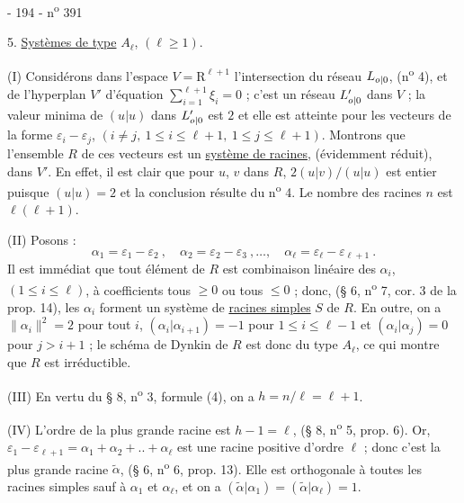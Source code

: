 - 194 - \hfill n\textsuperscript{o} 391

5. \uline{Systèmes de type} $A_\ell$, $(\ell\geq1)$.

(I) Considérons dans l'espace $V=\mathrm R^{\ell+1}$ l'intersection du réseau $L_{\relax{o|0}}$, (n\textsuperscript{o} 4), et de l'hyperplan $V'$ d'équation $\sum_{i=1}^{\ell+1}\xi_i=0$ ; c'est un réseau $L'_{\relax{o|0}}$ dans $V$ ; la valeur minima de $(u|u)$ dans $L'_{\relax{o|0}}$ est $2$ et elle est atteinte pour les vecteurs de la forme $\varepsilon_i-\varepsilon_j$, $(i\neq j,\ 1\leq i\leq\ell+1,\ 1\leq j\leq\ell+1)$. Montrons que l'ensemble $R$ de ces vecteurs est un \uline{système de racines}, (évidemment réduit), dans $V'$. En effet, il est clair que pour $u$, $v$ dans $R$, $2(u|v)/(u|u)$ est entier puisque $(u|u)=2$ et la conclusion résulte du n\textsuperscript{o} 4. Le nombre des racines $n$ est $\ell(\ell+1)$.

(II) Posons :
\[
\alpha_1=\varepsilon_1-\varepsilon_2\ ,\quad
\alpha_2=\varepsilon_2-\varepsilon_3\ ,\ldots,\quad
\alpha_\ell=\varepsilon_\ell-\varepsilon_{\ell+1}\ .
\]
Il est immédiat que tout élément de $R$ est combinaison linéaire des $\alpha_i$, $(1\leq i\leq\ell)$, à coefficients tous $\geq0$ ou tous $\leq0$ ; donc, (§ 6, n\textsuperscript{o} 7, cor. 3 de la prop. 14), les $\alpha_i$ forment un système de \uline{racines simples} $S$ de $R$. En outre, on a $\|\alpha_i\|^2=2$ pour tout $i$, $(\alpha_i|\alpha_{i+1})=-1$ pour $1\leq i\leq\ell-1$ et $(\alpha_i|\alpha_j)=0$ pour $j>i+1$ ; le schéma de Dynkin de $R$ est donc du type $A_\ell$, ce qui montre que $R$ est irréductible.

(III) En vertu du § 8, n\textsuperscript{o} 3, formule (4), on a $h=n/\ell=\ell+1$.

(IV) L'ordre de la plus grande racine est $h-1=\ell$, (§ 8, n\textsuperscript{o} 5, prop. 6). Or, $\varepsilon_1-\varepsilon_{\ell+1}=\alpha_1+\alpha_2+..+\alpha_\ell$ est une racine positive d'ordre $\ell$ ; donc c'est la plus grande racine $\widetilde\alpha$, (§ 6, n\textsuperscript{o} 6, prop. 13). Elle est orthogonale à toutes les racines simples sauf à $\alpha_1$ et $\alpha_\ell$, et on a $(\widetilde\alpha|\alpha_1)=(\widetilde\alpha|\alpha_\ell)=1$.
